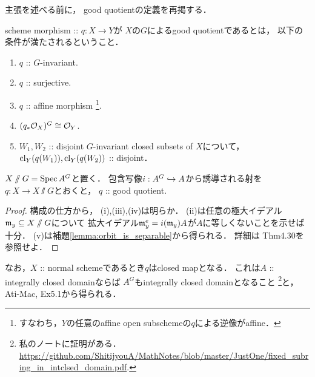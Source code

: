 \documentclass[a4paper]{jsarticle}
\begin{document}
    主張を述べる前に，
    good quotientの定義を再掲する．
    \begin{Def}
        scheme morphism :: $q: X \to Y$が
        $X$の$G$によるgood quotientであるとは，
        以下の条件が満たされるということ．
        \begin{enumerate}[label=(\roman*), leftmargin=*]
        \item $q$ :: $G$-invariant.
        \item $q$ :: surjective.
        \item $q$ :: affine morphism
              \footnote{ すなわち，$Y$の任意のaffine open subschemeの$q$による逆像がaffine． }.
        \item $(q_*\mathcal{O}_X)^G \cong \mathcal{O}_Y$.
        \item
            $W_1, W_2$ :: disjoint $G$-invariant closed subsets of $X$について，
            $\operatorname{cl}_Y(q(W_1)), \operatorname{cl}_Y(q(W_2))$ :: disjoint．
    \end{enumerate}
    \end{Def}

    \begin{Thm}\label{thm:git=good}
        $X \sslash G=\operatorname{Spec} A^G$と置く．
        包含写像$i: A^G \hookrightarrow A$から誘導される射を$q: X \to X \sslash G$とおくと，
        $q$ :: good quotient.
    \end{Thm}
    \begin{proof}
        構成の仕方から，
        (i),(iii),(iv)は明らか．
        (ii)は任意の極大イデアル$\mathfrak{m}_y \subseteq X \sslash G$について
        拡大イデアル$\mathfrak{m}_y^e=i(\mathfrak{m}_y)A$が$A$に等しくないことを示せば十分．
        (v)は補題\ref{lemma:orbit_is_separable}から得られる．
        詳細は\cite{Hos} Thm4.30を参照せよ．
    \end{proof}

    なお，$X$ :: normal schemeであるとき$q$はclosed mapとなる．
    これは$A$ :: integrally closed domainならば
    $A^G$もintegrally closed domainとなること
    \footnote
    {
        私のノートに証明がある．
        \url{https://github.com/ShitijyouA/MathNotes/blob/master/JustOne/fixed_subring_in_intclsed_domain.pdf}.
    }と，
    Ati-Mac, Ex5.1から得られる．
\end{document}
